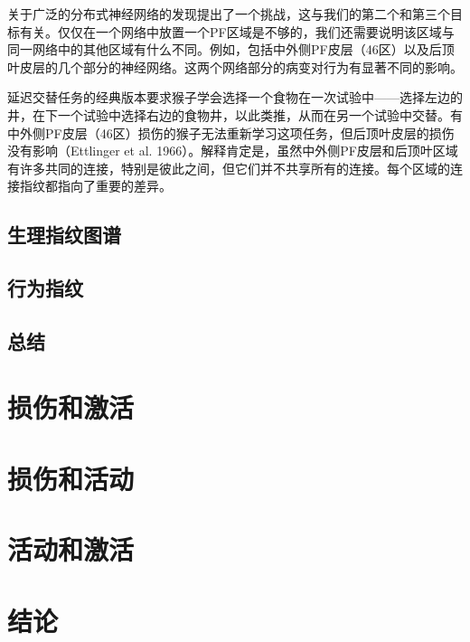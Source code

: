 \par
关于广泛的分布式神经网络的发现提出了一个挑战，这与我们的第二个和第三个目标有关。仅仅在一个网络中放置一个PF区域是不够的，我们还需要说明该区域与同一网络中的其他区域有什么不同。例如，包括中外侧PF皮层（46区）以及后顶叶皮层的几个部分的神经网络。这两个网络部分的病变对行为有显著不同的影响。
\par
延迟交替任务的经典版本要求猴子学会选择一个食物在一次试验中——选择左边的井，在下一个试验中选择右边的食物井，以此类推，从而在另一个试验中交替。有中外侧PF皮层（46区）损伤的猴子无法重新学习这项任务，但后顶叶皮层的损伤没有影响（Ettlinger et al. 1966）。解释肯定是，虽然中外侧PF皮层和后顶叶区域有许多共同的连接，特别是彼此之间，但它们并不共享所有的连接。每个区域的连接指纹都指向了重要的差异。
\subsection{生理指纹图谱}
\subsection{行为指纹}
\subsection{总结}

\section{损伤和激活}

\section{损伤和活动}

\section{活动和激活}




\section{结论}


